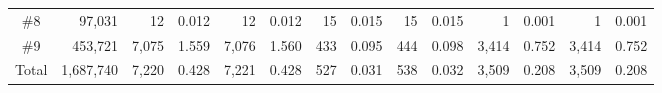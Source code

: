 \begin{table}[]
{\begin{tabular}{@{}crrlrlrlrlrlrl@{}}
\#8   & 97,031                        & 12            & 0.012        & 12          & 0.012      & 15          & 0.015      & 15          & 0.015     & 1           & 0.001     & 1           & 0.001     \\
\#9   & 453,721                       & 7,075         & 1.559        & 7,076       & 1.560      & 433         & 0.095      & 444         & 0.098     & 3,414       & 0.752     & 3,414       & 0.752     \\
Total & 1,687,740                     & 7,220         & 0.428        & 7,221       & 0.428      & 527         & 0.031      & 538         & 0.032     & 3,509       & 0.208     & 3,509       & 0.208     \\  
\bottomrule
\end{tabular}
}
\end{table}